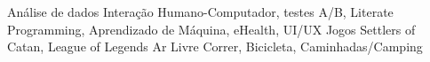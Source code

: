 \begin{cvinterests}
  \cvskill
    {Análise de dados}
    {Interação Humano-Computador, testes A/B, Literate Programming, Aprendizado de Máquina, eHealth, UI/UX}
  \cvskill
    {Jogos}
    {Settlers of Catan, League of Legends}
  \cvskill
    {Ar Livre}
    {Correr, Bicicleta, Caminhadas/Camping}
\end{cvinterests}
